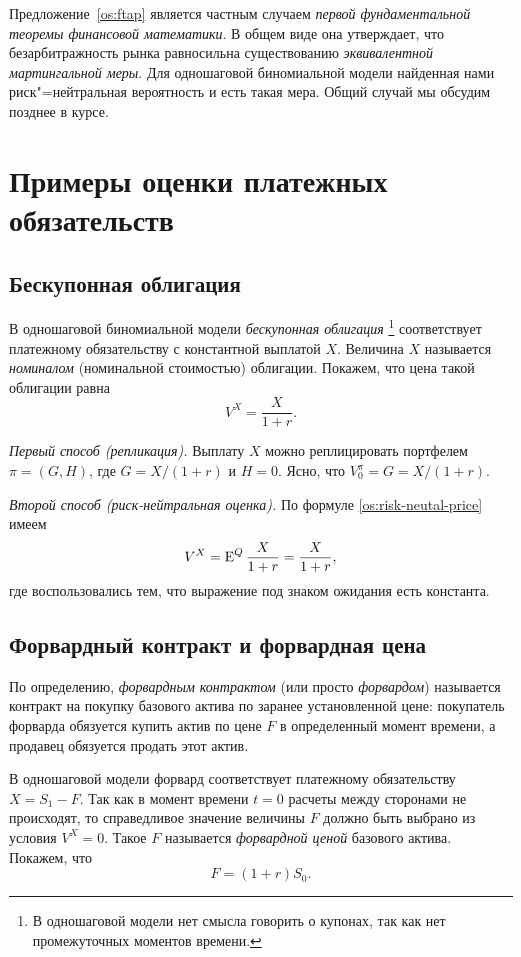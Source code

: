 \begin{remark}
Предложение~\ref{os:ftap} является частным случаем \emph{первой фундаментальной теоремы финансовой математики}.
В общем виде она утверждает, что безарбитражность рынка равносильна существованию \emph{эквивалентной мартингальной меры}.
Для одношаговой биномиальной модели найденная нами риск"=нейтральная вероятность и есть такая мера. Общий случай мы обсудим позднее в курсе.
\end{remark}


\section{Примеры оценки платежных обязательств}

\subsection{Бескупонная облигация}
В одношаговой биномиальной модели \emph{бескупонная облигация}%
\footnote{В одношаговой модели нет смысла говорить о купонах, так как нет промежуточных моментов времени.}
соответствует платежному обязательству с константной выплатой $X$. 
Величина $X$ называется \emph{номиналом} (номинальной стоимостью) облигации.
Покажем, что цена такой облигации равна
\[
V^X = \frac{X}{1+r}.
\]

\textit{Первый способ (репликация).}
Выплату $X$ можно реплицировать портфелем $\pi=(G,H)$, где $G = X/(1+r)$ и $H=0$. Ясно, что $V^\pi_0 = G = X/(1+r)$.

\textit{Второй способ (риск-нейтральная оценка).}
По формуле \eqref{os:risk-neutal-price} имеем
\[
V^X = \operatorname{E}^Q \frac{X}{1+r} = \frac{X}{1+r},
\]
где воспользовались тем, что выражение под знаком ожидания есть константа.

\subsection{Форвардный контракт и форвардная цена}
По определению, \emph{форвардным контрактом} (или просто \emph{форвардом}) называется контракт на покупку базового актива по заранее установленной цене: покупатель форварда обязуется купить актив по цене $F$ в определенный момент времени, а продавец обязуется продать этот актив.

В одношаговой модели форвард соответствует платежному обязательству $X = S_1 - F$.
Так как в момент времени $t=0$ расчеты между сторонами не происходят, то  справедливое значение величины $F$ должно быть выбрано из условия $V^X=0$. Такое $F$ называется \emph{форвардной ценой} базового актива.
Покажем, что 
\[
F = (1+r) S_0.
\]

